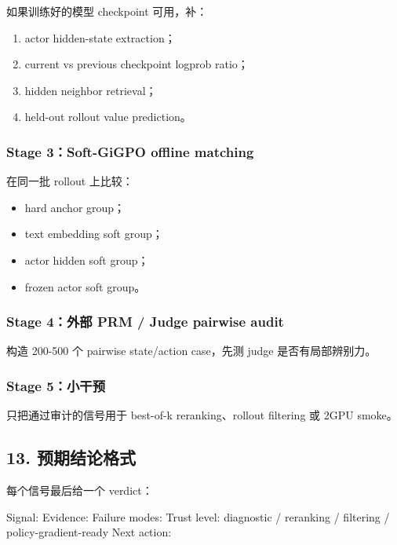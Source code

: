 \documentclass[
  10pt,
]{ctexart}
\newenvironment{Shaded}{}{}
\newcommand{\NormalTok}[1]{#1}
\providecommand{\tightlist}{%
  \setlength{\itemsep}{0pt}\setlength{\parskip}{0pt}}
\begin{document}
如果训练好的模型 checkpoint 可用，补：

\begin{enumerate}
\def\labelenumi{\arabic{enumi}.}
\tightlist
\item
  actor hidden-state extraction；
\item
  current vs previous checkpoint logprob ratio；
\item
  hidden neighbor retrieval；
\item
  held-out rollout value prediction。
\end{enumerate}

\subsubsection{Stage 3：Soft-GiGPO offline
matching}\label{stage-3soft-gigpo-offline-matching}

在同一批 rollout 上比较：

\begin{itemize}
\tightlist
\item
  hard anchor group；
\item
  text embedding soft group；
\item
  actor hidden soft group；
\item
  frozen actor soft group。
\end{itemize}

\subsubsection{Stage 4：外部 PRM / Judge pairwise
audit}\label{stage-4ux5916ux90e8-prm-judge-pairwise-audit}

构造 200-500 个 pairwise state/action case，先测 judge
是否有局部辨别力。

\subsubsection{Stage 5：小干预}\label{stage-5ux5c0fux5e72ux9884}

只把通过审计的信号用于 best-of-k reranking、rollout filtering 或 2GPU
smoke。

\subsection{13.
预期结论格式}\label{ux9884ux671fux7ed3ux8bbaux683cux5f0f}

每个信号最后给一个 verdict：

\begin{Shaded}
\begin{Highlighting}[]
\NormalTok{Signal:}
\NormalTok{Evidence:}
\NormalTok{Failure modes:}
\NormalTok{Trust level: diagnostic / reranking / filtering / policy{-}gradient{-}ready}
\NormalTok{Next action:}
\end{Highlighting}
\end{Shaded}
\end{document}

